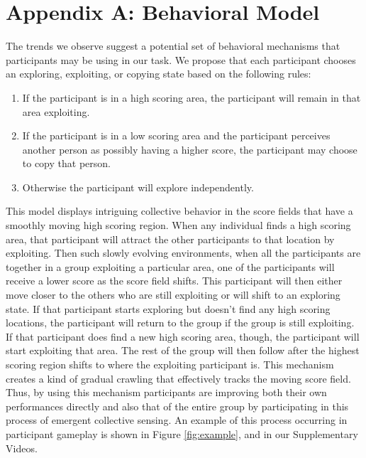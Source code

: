 \documentclass[12pt,letterpaper]{article}
\begin{document}


\setlength{\bibleftmargin}{.125in}
\setlength{\bibindent}{-\bibleftmargin}

\small{
  
}


\section*{Appendix A: Behavioral Model}

The trends we observe suggest a potential set of behavioral mechanisms
that participants may be using in our task.  We propose that each
participant chooses an exploring, exploiting, or copying state based on the following
rules:
\begin{enumerate}
\item
  If the participant is in a high scoring area, the participant will remain in that area
  exploiting.
\item
  If the participant is in a low scoring area and the participant perceives another
  person as possibly having a higher score, the participant may choose to
  copy that person.
\item
  Otherwise the participant will explore independently.
\end{enumerate}

This model displays intriguing collective behavior in the score fields that have a smoothly moving high scoring region.
When any individual finds a high scoring area, that participant will attract the
other participants to that location by exploiting.  Then such slowly evolving environments, when all the
participants are together in a group exploiting a particular area, one of
the participants will receive a lower score as the score field shifts.  This
participant will then either move closer to the others who are still
exploiting or will shift to an exploring state.  If that participant starts
exploring but doesn't find any high scoring locations, the participant will return
to the group if the group is still exploiting.  If that participant does
find a new high scoring area, though, the participant will start exploiting that
area.  The rest of the group will then follow after the highest
scoring region shifts to where the exploiting participant is.  This
mechanism creates a kind of gradual crawling that effectively tracks
the moving score field.  Thus, by using this mechanism participants are
improving both their own performances directly and also that of the
entire group by participating in this process of emergent collective
sensing.  An example of this process occurring in participant gameplay
is shown in Figure \ref{fig:example}, and in our Supplementary Videos.
\end{document}
